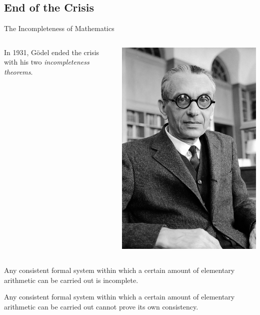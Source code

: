 \documentclass{beamer}
\begin{document}
\subsection{End of the Crisis}
\begin{frame}{The Incompleteness of Mathematics}
\vspace{\baselineskip}
\begin{columns}[c,onlytextwidth]
 \begin{column}{.75\textwidth}
In 1931, Gödel ended the crisis with his two \emph{incompleteness theorems}.
 \end{column}
 \begin{column}{.25\textwidth}
  \centering\includegraphics[height=0.35\textheight]{img/goedel.jpg}
 \end{column}
\end{columns}
\pause
	{\begin{theorem} Any consistent formal system within which a certain amount of elementary arithmetic can be carried out is incomplete.\end{theorem}}
\pause
	{\begin{theorem} Any consistent formal system within which a certain amount of elementary arithmetic can be carried out cannot prove its own consistency.\end{theorem}}
\end{frame}
\end{document}
